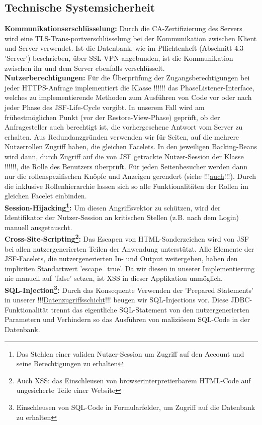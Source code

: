 \documentclass{article}
\begin{document}
\subsection{Technische Systemsicherheit}
\noindent \textbf{Kommunikationserschlüsselung:} Durch die CA-Zertifizierung des Servers wird eine TLS-Trans-portverschlüsselung bei der Kommunikation zwischen Klient und Server verwendet. Ist die Datenbank, wie im Pflichtenheft (Abschnitt 4.3  'Server') beschrieben, über SSL-VPN angebunden, ist die Kommunikation zwischen ihr und dem Server ebenfalls verschlüsselt. \\
\textbf{Nutzerberechtigungen:} Für die Überprüfung der Zugangsberechtigungen bei jeder HTTPS-Anfrage implementiert die Klasse !!!\hyperlink{}{}!!! das PhaseListener-Interface, welches zu implementierende Methoden zum Ausführen von Code vor oder nach jeder Phase des JSF-Life-Cycle vorgibt. In unserem Fall wird am frühestmöglichen Punkt (vor der Restore-View-Phase) geprüft, ob der Anfragesteller auch berechtigt ist, die vorhergesehene Antwort vom Server zu erhalten. Aus Redundanzgründen verwenden wir für Seiten, auf die mehrere Nutzerrollen Zugriff haben, die gleichen Facelets. In den jeweiligen Backing-Beans wird dann, durch Zugriff auf die von JSF getrackte Nutzer-Session der Klasse  !!!\hyperlink{}{}!!!, die Rolle des Benutzers überprüft. Für jeden Seitenbesucher werden dann nur die rollenspezifischen Knöpfe und Anzeigen gerendert (siehe !!!\hyperlink{}{auch}!!!). Durch die inklusive Rollenhierarchie lassen sich so alle Funktionalitäten der Rollen im gleichen Facelet einbinden.\\
\textbf{Session-Hijacking\footnote{Das Stehlen einer validen Nutzer-Session um Zugriff auf den Account und seine Berechtigungen zu erhalten}:} Um diesen Angriffsvektor zu schützen, wird der Identifikator der Nutzer-Session an kritischen Stellen (z.B. nach dem Login) manuell ausgetauscht. \\
\textbf{Cross-Site-Scripting\footnote{Auch XSS: das Einschleusen von browserinterpretierbarem HTML-Code auf ungesicherte Teile einer Website}:} Das Escapen von HTML-Sonderzeichen wird von JSF bei allen nutzergenerierten Teilen der Anwendung unterstützt. Alle Elemente der JSF-Facelets, die nutzergenerierten In- und Output weitergeben, haben den impliziten Standartwert 'escape=true'. Da wir diesen in unserer Implementierung nie manuell auf 'false' setzen, ist XSS in dieser Applikation unmöglich. \\
\textbf{SQL-Injection\footnote{Einschleusen von SQL-Code in Formularfelder, um Zugriff auf die Datenbank zu erhalten}:} Durch das Konsequente Verwenden der 'Prepared Statements' in unserer !!!\hyperlink{}{Datenzugriffsschicht}!!! beugen wir SQL-Injections vor. Diese JDBC-Funktionalität trennt das eigentliche SQL-Statement von den nutzergenerierten Parametern und Verhindern so das Ausführen von maliziösem SQL-Code in der Datenbank. \\
\end{document}
